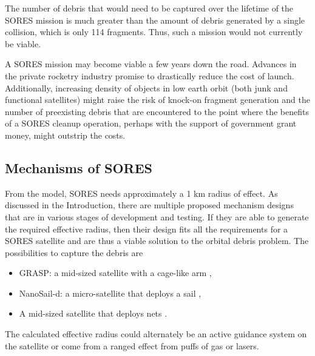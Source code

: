 \documentclass[12pt]{scrartcl}
\begin{document}
The number of debris that would need to be captured over the lifetime of the SORES mission is much greater than the amount of debris generated by a single collision, which is only 114 fragments. \cite{excel} Thus, such a mission would not currently be viable.

A SORES mission may become viable a few years down the road. Advances in the private rocketry industry promise to drastically reduce the cost of launch. Additionally, increasing density of objects in low earth orbit (both junk and functional satellites) might raise the risk of knock-on fragment generation and the number of preexisting debris that are encountered to the point where the benefits of a SORES cleanup operation, perhaps with the support of government grant money, might outstrip the costs. 

\subsection{Mechanisms of SORES}
From the model, SORES needs approximately a 1 km radius of effect. As discussed in the Introduction, there are multiple proposed mechanism designs that are in various stages of development and testing. If they are able to generate the required effective radius, then their design fits all the requirements for a SORES satellite and are thus a viable solution to the orbital debris problem. The possibilities to capture the debris are
\begin{itemize}
    \item GRASP: a mid-sized satellite with a cage-like arm \cite{tether},
    \item NanoSail-d: a micro-satellite that deploys a sail \cite{sail},
    \item A mid-sized satellite that deploys nets \cite{net}.
\end{itemize}
The calculated effective radius could alternately be an  active guidance system on the satellite or come from a ranged effect from puffs of gas or lasers.
\end{document}
